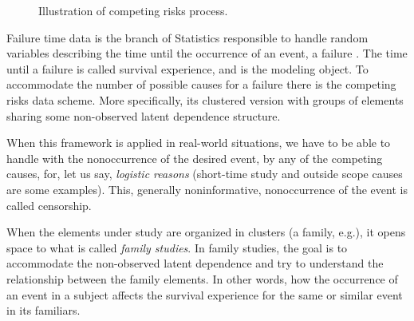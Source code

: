 \documentclass[a4paper,12pt]{article}
\begin{document}
\begin{figure}[H]
 \centering
 \caption{Illustration of competing risks process.}
 \label{fig:crp}
\end{figure}

Failure time data is the branch of Statistics responsible to handle
random variables describing the time until the occurrence of an event, a
failure \citep{kalb&prentice,hougaard00}. The time until a failure is
called survival experience, and is the modeling object. To accommodate
the number of possible causes for a failure there is the competing risks
data scheme. More specifically, its clustered version with groups of
elements sharing some non-observed latent dependence structure.

When this framework is applied in real-world situations, we have to be
able to handle with the nonoccurrence of the desired event, by any of
the competing causes, for, let us say, \textit{logistic reasons}
(short-time study and outside scope causes are some examples). This,
generally noninformative, nonoccurrence of the event is called
censorship.

When the elements under study are organized in clusters (a family,
e.g.), it opens space to what is called \textit{family studies}. In
family studies, the goal is to accommodate the non-observed latent
dependence and try to understand the relationship between the family
elements. In other words, how the occurrence of an event in a subject
affects the survival experience for the same or similar event in its
familiars.
\end{document}
